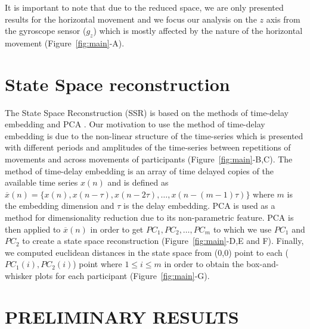 \documentclass{sig-alternate-05-2015}
\begin{document}
It is important to note that due to the reduced space, we are only presented
results for the horizontal movement and 
we focus our analysis on the $z$ axis from the gyroscope sensor ($g_z$) 
which is mostly affected by the nature of the horizontal movement (Figure~\ref{fig:main}-A).







\section{State Space reconstruction}

The State Space Reconstruction (SSR) is based on the methods of time-delay embedding and PCA \cite{Gibson1992}.
Our motivation to use the method of time-delay embedding
is due to the non-linear structure of the time-series
which is 
presented with different periods and amplitudes of the time-series 
between repetitions of movements and across movements of participants (Figure~\ref{fig:main}-B,C).
The method of time-delay embedding is an array of 
time delayed copies of the available time series $x(n)$ and is defined as  
$ \overline{x}(n) = \{  x(n), x(n-\tau), x(n-2\tau), \dots,x(n-(m-1)\tau)\}$
where $m$ is the embedding dimension and $\tau$ is the delay embedding.
PCA is used as a method for dimensionality reduction due to its non-parametric feature.
PCA is then applied to $ \overline{x}(n)$ in order to get $PC_1, PC_2, \dots, PC_m$ 
to which we use $PC_1$ and $PC_2$ 
to create a state space reconstruction (Figure~\ref{fig:main}-D,E and F).
Finally, we computed euclidean distances in the state space 
from (0,0) point to each ($PC_1(i),PC_2(i)$) point where $1 \leq i \leq m$
in order to obtain the box-and-whisker plots for each participant (Figure~\ref{fig:main}-G).


\section{PRELIMINARY RESULTS}
\end{document}
